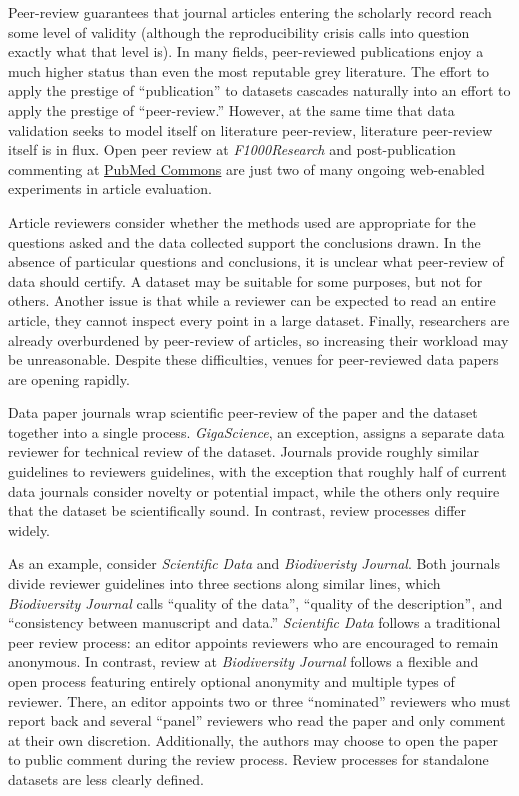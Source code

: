 \documentclass[10pt,twocolumn]{article}
\begin{document}
Peer-review guarantees that journal articles entering the scholarly record reach some level of validity (although the reproducibility crisis calls into question exactly what that level is).
In many fields, peer-reviewed publications enjoy a much higher status than even the most reputable grey literature.
The effort to apply the prestige of ``publication'' to datasets cascades naturally into an effort to apply the prestige of ``peer-review.''
However, at the same time that data validation seeks to model itself on literature peer-review, literature peer-review itself is in flux\cite{pulverer_transparent_2010, herron_is_2012, kriegeskorte_emerging_2012}.
Open peer review at \emph{F1000Research} and post-publication commenting at \href{http://www.ncbi.nlm.nih.gov/pubmedcommons/}{PubMed Commons} are just two of many ongoing web-enabled experiments in article evaluation.

Article reviewers consider whether the methods used are appropriate for the questions asked and the data collected support the conclusions drawn.
In the absence of particular questions and conclusions, it is unclear what peer-review of data should certify.
A dataset may be suitable for some purposes, but not for others.\cite{parsons_data_2010}
Another issue is that while a reviewer can be expected to read an entire article, they cannot inspect every point in a large dataset.
Finally, researchers are already overburdened by peer-review of articles\cite{diederich_are_2013}, so increasing their workload may be unreasonable.
Despite these difficulties, venues for peer-reviewed data papers are opening rapidly.

Data paper journals wrap scientific peer-review of the paper and the dataset together into a single process.
\emph{GigaScience}, an exception, assigns a separate data reviewer for technical review of the dataset.
Journals provide roughly similar guidelines to reviewers guidelines, with the exception that roughly half of current data journals consider novelty or potential impact, while the others only require that the dataset be scientifically sound.
In contrast, review processes differ widely.

As an example, consider \emph{Scientific Data} and \emph{Biodiveristy Journal}.
Both journals divide reviewer guidelines into three sections along similar lines, which \emph{Biodiversity Journal} calls ``quality of the data'', ``quality of the description'', and ``consistency between manuscript and data.''
\emph{Scientific Data} follows a traditional peer review process: an editor appoints reviewers who are encouraged to remain anonymous.
In contrast, review at \emph{Biodiversity Journal} follows a flexible and open process featuring entirely optional anonymity and multiple types of reviewer.
There, an editor appoints two or three ``nominated'' reviewers who must report back and several ``panel'' reviewers who read the paper and only comment at their own discretion.
Additionally, the authors may choose to open the paper to public comment during the review process.
Review processes for standalone datasets are less clearly defined.
\end{document}
